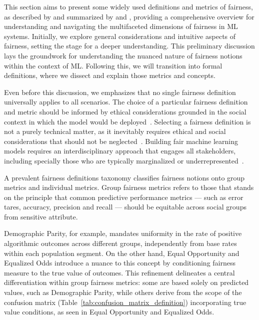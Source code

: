 This section aims to present some widely used definitions and metrics of fairness, as described by \cite{Verma2018} and summarized by \cite{Mehrabi2019} and \cite{caton2023}, providing a comprehensive overview for understanding and navigating the multifaceted dimensions of fairness in ML systems. Initially, we explore general considerations and intuitive aspects of fairness, setting the stage for a deeper understanding. This preliminary discussion lays the groundwork for understanding the nuanced nature of fairness notions within the context of ML. Following this, we will transition into formal definitions, where we dissect and explain those metrics and concepts.

Even before this discussion, we emphasizes that no single fairness definition universally applies to all scenarios. The choice of a particular fairness definition and metric should be informed by ethical considerations grounded in the social context in which the model would be deployed~\citep{AlerTubella2022}. Selecting a fairness definition is not a purely technical matter, as it inevitably requires ethical and social considerations that should not be neglected~\citep{Alves2023}. Building fair machine learning models requires an interdisciplinary approach that engages all stakeholders, including specially those who are typically marginalized or underrepresented~\citep{Weinberg2022}.


A prevalent fairness definitions taxonomy classifies fairness notions onto group metrics and individual metrics. Group fairness metrics refers to those that stands on the principle that common predictive performance metrics  —  such as error tares, accuracy, precision and recall  —  should be equitable across social groups from sensitive attribute.  

Demographic Parity, for example, mandates uniformity in the rate of positive algorithmic outcomes across different groups, independently from base rates within each population segment. On the other hand, Equal Opportunity and Equalized Odds introduce a nuance to this concept by conditioning fairness measure to the true value of outcomes. This refinement delineates a central differentiation within group fairness metrics: some are based solely on predicted values, such as Demographic Parity, while others derive from the scope of the confusion matrix (Table~\ref{tab:confusion_matrix_definition}) incorporating true value conditions, as seen in Equal Opportunity and Equalized Odds.

